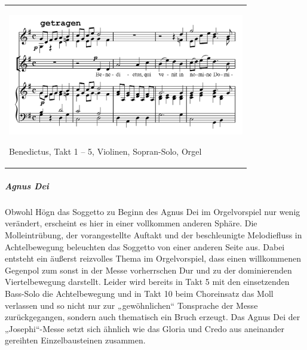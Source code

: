 \begin{flushleft}
\tablefirsthead{}
\tablehead{}
\tabletail{}
\tablelasttail{}
\begin{supertabular}{m{10.528cm}}

\includegraphics[width=10.345cm,height=5.313cm]{pictures/zulassungsarbeit-img122.png}
\begin{figure}
\img{}
\caption{}
\end{figure}
Benedictus, Takt 1 – 5, Violinen,
Sopran-Solo, Orgel\\
\end{supertabular}
\end{flushleft}
\clearpage\subparagraph{Agnus Dei}
Obwohl Högn das Soggetto zu Beginn des Agnus Dei im Orgelvorspiel nur
wenig verändert, erscheint es hier in einer vollkommen anderen Sphäre.
Die Molleintrübung, der vorangestellte Auftakt und der beschleunigte
Melodiefluss in Achtelbewegung beleuchten das Soggetto von einer
anderen Seite aus. Dabei entsteht ein äußerst reizvolles Thema im
Orgelvorspiel, dass einen willkommenen Gegenpol zum sonst in der Messe
vorherrschen Dur und zu der dominierenden Viertelbewegung darstellt.
Leider wird bereits in Takt 5 mit den einsetzenden Bass-Solo die
Achtelbewegung und in Takt 10 beim Choreinsatz das Moll verlassen und
so nicht nur zur „gewöhnlichen“ Tonsprache der Messe zurückgegangen,
sondern auch thematisch ein Bruch erzeugt. Das Agnus Dei der
„Josephi“-Messe setzt sich ähnlich wie das Gloria und Credo aus
aneinander gereihten Einzelbausteinen zusammen.


